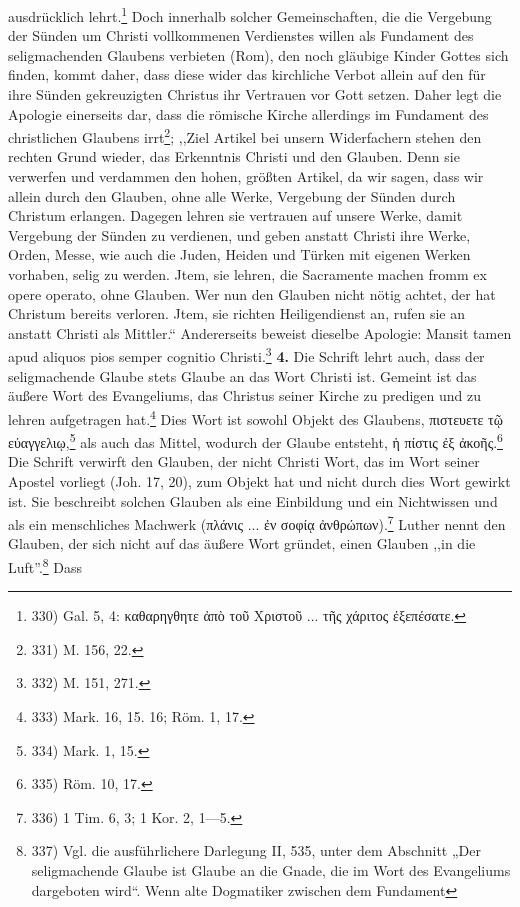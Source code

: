 ausdrücklich lehrt.\footnote{330) Gal. 5, 4: \textgreek{καθαρηγθητε ἀπὸ τοῦ Χριστοῦ ... τῆς χάριτος ἐξεπέσατε.}} Doch innerhalb solcher Gemeinschaften, die die Vergebung der Sünden um Christi vollkommenen Verdienstes willen als Fundament des seligmachenden Glaubens verbieten (Rom), den noch gläubige Kinder Gottes sich finden, kommt daher, dass diese wider das kirchliche Verbot allein auf den für ihre Sünden gekreuzigten Christus ihr Vertrauen vor Gott setzen. Daher legt die Apologie einerseits dar, dass die römische Kirche allerdings im Fundament des christlichen Glaubens irrt\footnote{331) M. 156, 22.}; ,,Ziel Artikel bei unsern Widerfachern stehen den rechten Grund wieder, das Erkenntnis Christi und den Glauben. Denn sie verwerfen und verdammen den hohen, größten Artikel, da wir sagen, dass wir allein durch den Glauben, ohne alle Werke, Vergebung der Sünden durch Christum erlangen. Dagegen lehren sie vertrauen auf unsere Werke, damit Vergebung der Sünden zu verdienen, und geben anstatt Christi ihre Werke, Orden, Messe, wie auch die Juden, Heiden und Türken mit eigenen Werken vorhaben, selig zu werden. Jtem, sie lehren, die Sacramente machen fromm ex opere operato, ohne Glauben. Wer nun den Glauben nicht nötig achtet, der hat Christum bereits verloren. Jtem, sie richten Heiligendienst an, rufen sie an anstatt Christi als Mittler.“ Andererseits beweist dieselbe Apologie: Mansit tamen apud aliquos pios semper cognitio Christi.\footnote{332) M. 151, 271.} \noindent \textbf{4.} Die Schrift lehrt auch, dass der seligmachende Glaube stets Glaube an das Wort Christi ist. Gemeint ist das äußere Wort des Evangeliums, das Christus seiner Kirche zu predigen und zu lehren aufgetragen hat.\footnote{333) Mark. 16, 15. 16; Röm. 1, 17.} Dies Wort ist sowohl Objekt des Glaubens, \textgreek{πιστευετε τῷ εὐαγγελιῳ},\footnote{334) Mark. 1, 15.} als auch das Mittel, wodurch der Glaube entsteht, \textgreek{ἡ πίστις ἐξ ἀκοῆς}.\footnote{335) Röm. 10, 17.} Die Schrift verwirft den Glauben, der nicht Christi Wort, das im Wort seiner Apostel vorliegt (Joh. 17, 20), zum Objekt hat und nicht durch dies Wort gewirkt ist. Sie beschreibt solchen Glauben als eine Einbildung und ein Nichtwissen und als ein menschliches Machwerk (\textgreek{πλάνις ... ἐν σοφίᾳ ἀνθρώπων}).\footnote{336) 1 Tim. 6, 3; 1 Kor. 2, 1—5.} Luther nennt den Glauben, der sich nicht auf das äußere Wort gründet, einen Glauben ,,in die Luft''.\footnote{337) Vgl. die ausführlichere Darlegung II, 535, unter dem Abschnitt „Der seligmachende Glaube ist Glaube an die Gnade, die im Wort des Evangeliums dargeboten wird“. Wenn alte Dogmatiker zwischen dem Fundament} Dass